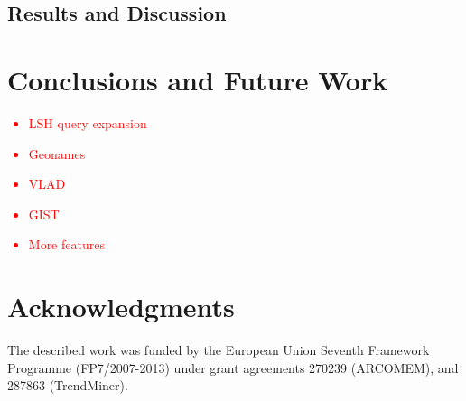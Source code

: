 \documentclass{../acm_proc_article-me11_tweaked}
\begin{document}
\subsection{Results and Discussion}

\section{Conclusions and Future Work}
\textcolor{red}{\begin{itemize}
    \item LSH query expansion
    \item Geonames
    \item VLAD
    \item GIST
    \item More features
\end{itemize}}

\section{Acknowledgments}
The described work was funded by the European Union Seventh Framework Programme (FP7/2007-2013) under grant agreements 270239 (ARCOMEM), and 287863 (TrendMiner).




\end{document}
